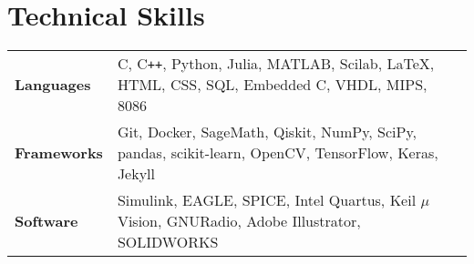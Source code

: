 \documentclass[10pt,a4paper,sans]{moderncv}        %
\begin{document}
\section{Technical Skills}
\setlength\tabcolsep{0.3em}
\hspace{-5pt}
\begin{tabular}{p{1.15in}p{5.85in}}
\textbf{Languages}& C, C\texttt{++}, Python, Julia, MATLAB, Scilab, \LaTeX, HTML, CSS,  SQL, Embedded C, VHDL, MIPS, 8086\\%
\textbf{Frameworks}& Git, Docker, SageMath, Qiskit, NumPy, SciPy, pandas, scikit-learn, OpenCV, TensorFlow, Keras, Jekyll\\%
\textbf{Software}& Simulink, EAGLE, SPICE, Intel Quartus, Keil $\mu$Vision, GNURadio, Adobe Illustrator, SOLIDWORKS\\%
\end{tabular}
\end{document}
